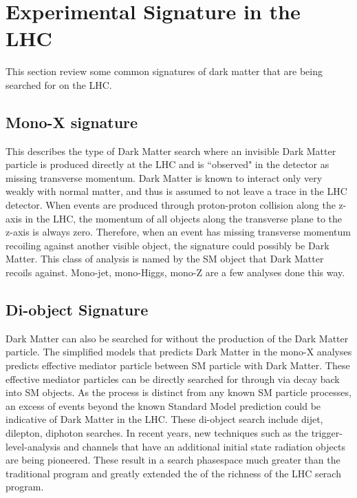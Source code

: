 
\section{Experimental Signature in the LHC}
\label{section:signatures}
This section review some common signatures of dark matter that are being searched for on the LHC.

\subsection{Mono-X signature}
\label{sec:monoX}
    This describes the type of Dark Matter search where an invisible Dark Matter particle is produced directly at the LHC and is ``observed" in the detector as missing transverse momentum.
    Dark Matter is known to interact only very weakly with normal matter, and thus is assumed to not leave a trace in the LHC detector. When events are produced through proton-proton collision along the z-axis in the LHC, the momentum of all objects along the transverse plane to the z-axis is always zero. Therefore, when an event has missing transverse momentum recoiling against another visible object, the signature could possibly be Dark Matter.
This class of analysis is named by the SM object that Dark Matter recoils against. Mono-jet, mono-Higgs, mono-Z are a few analyses done this way. 

\subsection{Di-object Signature}
    Dark Matter can also be searched for without the production of the Dark Matter particle. The simplified models that predicts Dark Matter in the mono-X analyses predicts effective mediator particle between SM particle with Dark Matter. These effective mediator particles can be directly searched for through via decay back into SM objects. As the process is distinct from any known SM particle processes, an excess of events beyond the known Standard Model prediction could be indicative of Dark Matter in the LHC. These di-object search include dijet, dilepton, diphoton searches. In recent years, new techniques such as the trigger-level-analysis and channels that have an additional initial state radiation objects are being pioneered. These result in a search phasespace much greater than the traditional program and greatly extended the of the richness of the LHC serach program.


